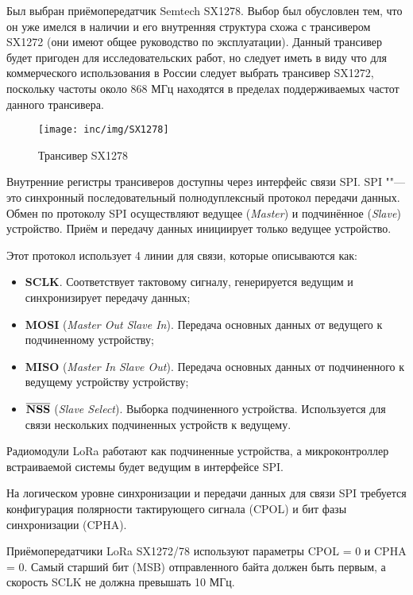 Был выбран приёмопередатчик Semtech SX1278. Выбор был обусловлен тем, что он 
уже имелся в наличии и его внутренняя структура схожа с трансивером SX1272 (они 
имеют общее руководство по эксплуатации).
Данный трансивер будет пригоден для исследовательских работ, но следует иметь в 
виду что для коммерческого использования в России следует выбрать трансивер 
SX1272, поскольку частоты около 868 МГц находятся в пределах поддерживаемых 
частот данного трансивера.

\begin{figure}[!h]
  \centering
  \texttt{[image: inc/img/SX1278]}
  \caption{Трансивер SX1278}
  \label{fig:sx1278}
\end{figure}

Внутренние регистры трансиверов доступны через интерфейс связи SPI.
SPI ""--- это синхронный последовательный полнодуплексный протокол передачи 
данных. 
Обмен по протоколу SPI осуществляют ведущее (\textit{Master}) и подчинённое 
(\textit{Slave}) устройство. Приём и передачу данных инициирует только ведущее 
устройство.

Этот протокол использует 4 линии для связи, которые описываются как:
\begin{itemize}
 \item \textbf{SCLK}. Соответствует тактовому сигналу, генерируется ведущим и 
синхронизирует передачу данных;
 \item \textbf{MOSI} (\textit{Master Out Slave In}). Передача основных данных 
от ведущего к подчиненному устройству;
 \item \textbf{MISO} (\textit{Master In Slave Out}). Передача основных данных 
от подчиненного к ведущему устройству устройству;
 \item $\overline{\text{\textbf{NSS}}}$ (\textit{Slave Select}). Выборка 
подчиненного устройства. Используется для связи нескольких подчиненных 
устройств к ведущему. 
\end{itemize}

Радиомодули LoRa работают как подчиненные устройства, а микроконтроллер 
встраиваемой системы будет ведущим в интерфейсе SPI.

На логическом уровне синхронизации и передачи данных для связи SPI требуется 
конфигурация полярности тактирующего сигнала (CPOL) и бит фазы синхронизации 
(CPHA).

Приёмопередатчики LoRa SX1272/78 используют параметры CPOL = 0 и CPHA = 0.
Самый старший бит (MSB) отправленного байта должен быть первым, а скорость SCLK 
не должна превышать 10 МГц.

